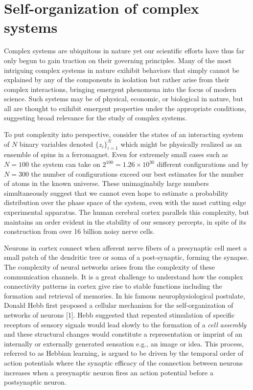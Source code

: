 \documentclass{ucetd}
\begin{document}
\mainmatter

\chapter{Self-organization of complex systems}

Complex systems are ubiquitous in nature yet our scientific efforts have thus far only begun to gain traction on their governing principles. Many of the most intriguing complex systems in nature exihibit behaviors that simply cannot be explained by any of the components in isolation but rather arise from their complex interactions, bringing emergent phenomena into the focus of modern science. Such systems may be of physical, economic, or biological in nature, but all are thought to exihibit emergent properties under the appropriate conditions, suggesting broad relevance for the study of complex systems. 

To put complexity into perspective, consider the states of an interacting system of $N$ binary variables denoted $\{z_{i}\}_{i=1}^{N}$ which might be physically realized as an ensemble of spins in a ferromagnet. Even for extremely small cases such as $N=100$ the system can take on $2^{100} = 1.26\times 10^{30}$ different configurations and by $N=300$ the number of configurations exceed our best estimates for the number of atoms in the known universe. These unimaginabily large numbers simultaneously suggest that we cannot even hope to estimate a probability distribution over the phase space of the system, even with the most cutting edge experimental apparatus. The human cerebral cortex parallels this complexity, but maintains an order evident in the stability of our sensory percepts, in spite of its construction from over 16 billion noisy nerve cells. 

Neurons in cortex connect when afferent nerve fibers of a presynaptic cell meet a small patch of the dendritic tree or soma of a post-synaptic, forming the synapse. The complexity of neural networks arises from the complexity of these communication channels. It is a great challenge to understand how the complex connectivity patterns in cortex give rise to stable functions including the formation and retrieval of memories. In his famous neurophysiological postulate, Donald Hebb first proposed a cellular mechanism for the self-organization of networks of neurons [1]. Hebb suggested that repeated stimulation of specific receptors of sensory signals would lead slowly to the formation of a \emph{cell assembly} and these structural changes would constitute a representation or imprint of an internally or externally generated sensation e.g., an image or idea. This process, referred to as Hebbian learning, is argued to be driven by the temporal order of action potentials where the synaptic efficacy of the connection between neurons increases when a presynaptic neuron fires an action potential before a postsynaptic neuron.
\end{document}
